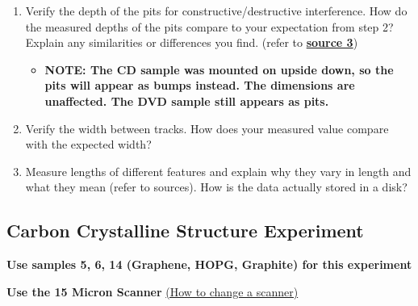 \documentclass{../lab}
\begin{document}
\begin{enumerate}
    \item Verify the depth of the pits for constructive/destructive interference. How do the measured depths of the pits compare to your expectation from step 2?  Explain any similarities or differences you find.  (refer to \href{http://experimentationlab.berkeley.edu/sites/default/files/How_do_Rewriteable_CDs_work.pdf}{\textbf{source 3}})

    \begin{itemize}
        \item ​​\textbf{NOTE: The CD sample was mounted on upside down, so the pits will appear as bumps instead.  The dimensions are unaffected.  The DVD sample still appears as pits.}

    \end{itemize}

    \item Verify the width between tracks. How does your measured value compare with the expected width?

    \item Measure lengths of different features and explain why they vary in length and what they mean (refer to sources).  How is the data actually stored in a disk?

\end{enumerate}

\subsection{Carbon Crystalline Structure Experiment}
\label{subsec:CarbonCrystal}

\textbf{Use samples 5, 6, 14 (Graphene, HOPG, Graphite) for this experiment}

\textbf{Use the 15 Micron Scanner} \hyperref[subsec:ChangingScanners]{(How to change a scanner)}
\end{document}
